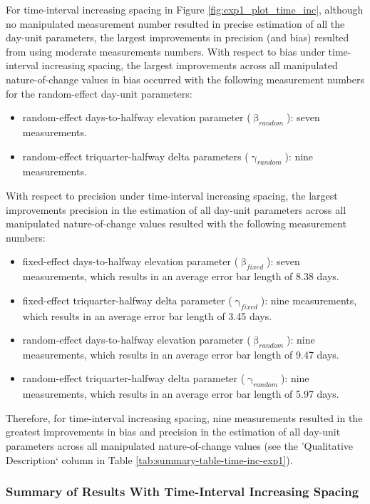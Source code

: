 \documentclass[
12pt, %
twoside,
english]{guelphthesis}
\begin{document}
For time-interval increasing spacing in Figure \ref{fig:exp1_plot_time_inc}, although no manipulated measurement number resulted in precise estimation of all the day-unit parameters, the largest improvements in precision (and bias) resulted from using moderate measurements numbers. With respect to bias under time-interval increasing spacing, the largest improvements across all manipulated nature-of-change values in bias occurred with the following measurement numbers for the random-effect day-unit parameters:
\begin{itemize}
\tightlist
\item
  random-effect days-to-halfway elevation parameter (\(\upbeta_{random}\)): seven measurements.
\item
  random-effect triquarter-halfway delta parameters (\(\upgamma_{random}\)): nine measurements.
\end{itemize}
\noindent With respect to precision under time-interval increasing spacing, the largest improvements precision in the estimation of all day-unit parameters across all manipulated nature-of-change values resulted with the following measurement numbers:
\begin{itemize}
\tightlist
\item
  fixed-effect days-to-halfway elevation parameter (\(\upbeta_{fixed}\)): seven measurements, which results in an average error bar length of 8.38 days.
\item
  fixed-effect triquarter-halfway delta parameter (\(\upgamma_{fixed}\)): nine measurements, which results in an average error bar length of 3.45 days.
\item
  random-effect days-to-halfway elevation parameter (\(\upbeta_{random}\)): nine measurements, which results in an average error bar length of 9.47 days.
\item
  random-effect triquarter-halfway delta parameter (\(\upgamma_{random}\)): nine measurements, which results in an average error bar length of 5.97 days.
\end{itemize}
\noindent Therefore, for time-interval increasing spacing, nine measurements resulted in the greatest improvements in bias and precision in the estimation of all day-unit parameters across all manipulated nature-of-change values (see the 'Qualitative Description` column in Table \ref{tab:summary-table-time-inc-exp1}).

\hypertarget{summary-of-results-with-time-interval-increasing-spacing}{%
\subsubsection{Summary of Results With Time-Interval Increasing Spacing}\label{summary-of-results-with-time-interval-increasing-spacing}}
\end{document}
